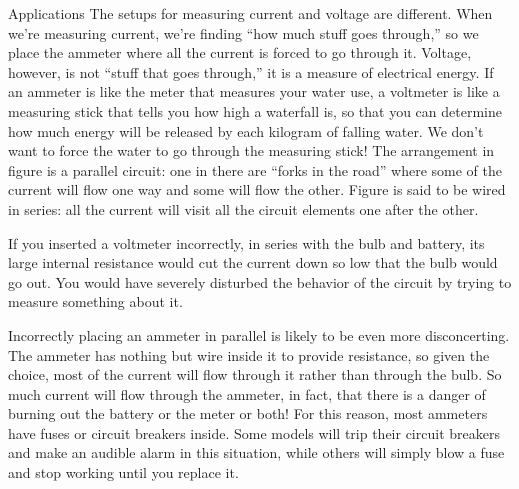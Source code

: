 \begin{envsubsection}{Applications}
The setups for measuring current and voltage are different.
When we're measuring current, we're finding ``how much
stuff goes through,'' so we place the ammeter where all the
current is forced to go through it. Voltage, however, is not
``stuff that goes through,'' it is a measure of electrical
energy. If an ammeter is like the meter that measures your
water use, a voltmeter is like a measuring stick that tells
you how high a waterfall is, so that you can determine how
much energy will be released by each kilogram of falling
water. We don't want to force the water to go through the
measuring stick! The arrangement in figure  is a
parallel
circuit: one in there are ``forks in the road'' where some
of the current will flow one way and some will flow the
other. Figure  is said to be wired in
series:
all the current will visit all the
circuit elements one after the other.

If you inserted a voltmeter incorrectly, in series with the
bulb and battery, its large internal resistance would cut
the current down so low that the bulb would go out. You
would have severely disturbed the behavior of the circuit by
trying to measure something about it.

Incorrectly placing an ammeter in parallel is likely to be
even more disconcerting. The ammeter has nothing but wire
inside it to provide resistance, so given the choice, most
of the current will flow through it rather than through the
bulb. So much current will flow through the ammeter, in
fact, that there is a danger of burning out the battery or
the meter or both! For this reason, most ammeters have fuses
or circuit breakers inside. Some models will trip their
circuit breakers and make an audible alarm in this
situation, while others will simply blow a fuse and stop
working until you replace it.
\end{envsubsection}

